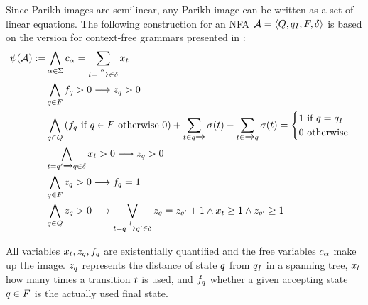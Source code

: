 \documentclass[acmsmall,review,anonymous,screen]{acmart}\settopmatter{printfolios=true,printccs=true,printacmref=true}
\theoremstyle{definition}
\begin{document}
Since Parikh images are semilinear, any Parikh image can be written as a set of linear
equations. The following construction for an NFA $\mathcal{A} = \left\langle Q, q_I, F, \delta\right\rangle$ is based on the version for context-free grammars presented in \cite{generate-parikh-image}:
\begin{equation}
\begin{aligned}
\ParikhMap(\Automaton) := 
& \AndComp{\Letter \in \Alphabet}{\LetterVar_{\Letter} = \sum_{\Transition = \FromLabelTo{}{\Letter}{} \in \Transitions} \TransitionVar_{\Transition}
}\\
& \AndComp{\State \in \AcceptingStates}{\FinalStateVar_{\State} > 0 \longrightarrow  \StateVar_{\State} > 0}\\
& \AndComp{\State \in \States}{
  \left(\FinalStateVar_{\State} \text{ if } \State \in \AcceptingStates \text{ otherwise } 0 \right) +
  \sum_{\Transition \in \FromLabelTo{\State}{}{}} \Filter(\Transition) - \sum_{\Transition \in \FromLabelTo{}{}{\State}} \Filter(\Transition)
= \begin{cases}
    1 \text{  if $\State = \InitialState$} \\
    0 \text{ otherwise}
  \end{cases}
}\\
& \AndComp{\Transition = \FromLabelTo{\State'}{}{\State} \in \Transitions}{
  \TransitionVar_{\Transition} > 0 \longrightarrow \StateVar_{\State} > 0
} \\
& \AndComp{\State \in F}{
  \StateVar_{\State} > 0 \longrightarrow \FinalStateVar_{\State} = 1
} \\
&\AndComp{\State \in \States}{
  \StateVar_{\State} > 0 \longrightarrow
  \OrComp{\Transition = \FromLabelTo{\State}{\Label}{\State'} \in \Transitions}{
    \StateVar_{\State} = \StateVar_{\State'} + 1 \land 
    \TransitionVar_{\Transition} \geq 1 \land
  \StateVar_{\State'} \geq 1
    }
}
\end{aligned}
\label{eq:generate-parikh}
\end{equation}

All variables $x_t, z_q, f_q$ are
existentially quantified and the free variables $c_\alpha$ make up the
image. $z_q$ represents the distance of state $q$ from
$q_I$ in a spanning tree, $x_t$ how many times
a transition $t$ is used, and $f_q$ whether a given
accepting state $q \in F$ is the actually used final state.
\end{document}
